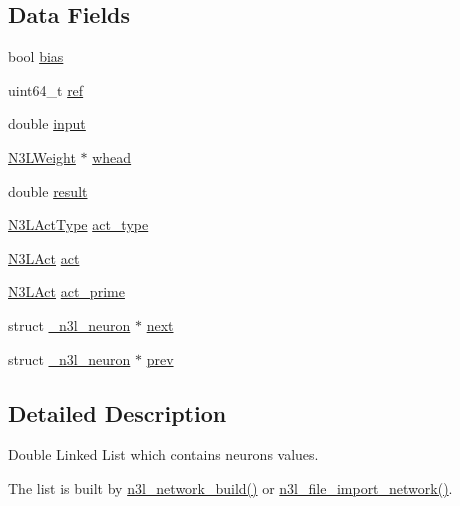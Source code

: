 \subsection*{Data Fields}
\begin{DoxyCompactItemize}
\item 
bool \hyperlink{struct__n3l__neuron_a0f3291ff81ab13111e538622ab662069}{bias}
\item 
uint64\+\_\+t \hyperlink{struct__n3l__neuron_aa0053e003b954df3b58853f003284958}{ref}
\item 
double \hyperlink{struct__n3l__neuron_ac896f5f8bd82c056cc61872120391048}{input}
\item 
\hyperlink{n3__header_8h_ac37c67a24ec253f5cd205cbc981922ca}{N3\+L\+Weight} $\ast$ \hyperlink{struct__n3l__neuron_ac9259a513822ea957c03430988adfa6a}{whead}
\item 
double \hyperlink{struct__n3l__neuron_afc9c38f4676dbe2ead749f8b6c81f491}{result}
\item 
\hyperlink{n3__header_8h_a3118e8995213ca26bd388c3d94cd8056}{N3\+L\+Act\+Type} \hyperlink{struct__n3l__neuron_af424e7accb8d1d089b828a1de69e03a0}{act\+\_\+type}
\item 
\hyperlink{n3__header_8h_afb10e6f7012513b51225a4d3add36cae}{N3\+L\+Act} \hyperlink{struct__n3l__neuron_a3ed17ddbe86d42ed6b7d31256b109262}{act}
\item 
\hyperlink{n3__header_8h_afb10e6f7012513b51225a4d3add36cae}{N3\+L\+Act} \hyperlink{struct__n3l__neuron_a9c9de65191cb097fd7a71752c83fc3db}{act\+\_\+prime}
\item 
struct \hyperlink{struct__n3l__neuron}{\+\_\+n3l\+\_\+neuron} $\ast$ \hyperlink{struct__n3l__neuron_a55f1bc3d589d69c5a940d0cb497610c4}{next}
\item 
struct \hyperlink{struct__n3l__neuron}{\+\_\+n3l\+\_\+neuron} $\ast$ \hyperlink{struct__n3l__neuron_a706ad4614fd4d1bd9a824f6ea8c0c9e5}{prev}
\end{DoxyCompactItemize}


\subsection{Detailed Description}
Double Linked List which contains neuron\textquotesingle{}s values. 

The list is built by \hyperlink{n3__network_8c_a5f87e1efebd658dd55d7d2ca1768bdba}{n3l\+\_\+network\+\_\+build()} or \hyperlink{n3__file_8c_a4fef76548ed87845dceafaa9527a83d0}{n3l\+\_\+file\+\_\+import\+\_\+network()}.


